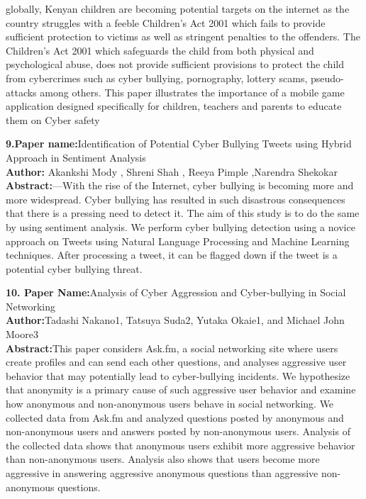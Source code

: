\documentclass[oneside,a4paper,12pt]{report}
\begin{document}
globally, Kenyan children are becoming potential targets on the internet as the
country struggles with a feeble Children’s Act 2001 which fails to provide sufficient
protection to victims as well as stringent penalties to the offenders. The Children’s
Act 2001 which safeguards the child from both physical and psychological abuse,
does not provide sufficient provisions to protect the child from cybercrimes such as
cyber bullying, pornography, lottery scams, pseudo-attacks among others. This paper
illustrates the importance of a mobile game application designed specifically for
children, teachers and parents to educate them on Cyber safety\\
\newpage
\item \textbf{9.Paper name:}Identification of Potential Cyber Bullying Tweets
using Hybrid Approach in Sentiment Analysis\\
\textbf{Author:} Akankshi Mody , Shreni Shah , Reeya Pimple ,Narendra Shekokar\\
\textbf{Abstract:}—With the rise of the Internet, cyber bullying is
becoming more and more widespread. Cyber bullying has
resulted in such disastrous consequences that there is a pressing
need to detect it. The aim of this study is to do the same by using
sentiment analysis. We perform cyber bullying detection using a
novice approach on Tweets using Natural Language Processing
and Machine Learning techniques. After processing a tweet, it
can be flagged down if the tweet is a potential cyber bullying
threat.\\
\newpage

\item \textbf{10. Paper Name:}Analysis of Cyber Aggression and Cyber-bullying in Social Networking \\
\textbf{Author:}Tadashi Nakano1, Tatsuya Suda2, Yutaka Okaie1, and Michael John Moore3\\
\textbf{Abstract:}This paper considers Ask.fm, a social networking
site where users create profiles and can send each other
questions, and analyses aggressive user behavior that may
potentially lead to cyber-bullying incidents. We hypothesize
that anonymity is a primary cause of such aggressive user
behavior and examine how anonymous and non-anonymous
users behave in social networking. We collected data from
Ask.fm and analyzed questions posted by anonymous and
non-anonymous users and answers posted by non-anonymous
users. Analysis of the collected data shows that anonymous
users exhibit more aggressive behavior than non-anonymous
users. Analysis also shows that users become more aggressive
in answering aggressive anonymous questions than aggressive
non-anonymous questions.\\
\end{document}
